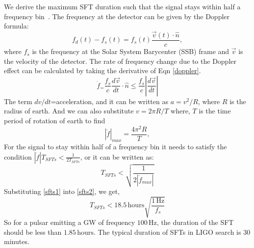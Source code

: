 \documentclass{ttuthes2007}
\begin{document}
We derive the maximum \ac{SFT} duration such that the signal stays within half
a frequency bin~\cite{Krishnan_2004}. The frequency at the detector can be given by the Doppler formula:
\begin{equation}
\label{doppler}
f_d(t) - f_s(t) = f_s(t)\frac{\vec{v}(t)\cdot\hat{n}}{c},
\end{equation}
where $f_s$ is the frequency at the Solar System Barycenter (SSB) frame and
$\vec{v}$ is the velocity of the detector.
The rate of frequency change due to the Doppler effect can be calculated by
taking the derivative of Eqn \ref{doppler}.
\begin{equation}
\dot{f}_= \frac{f_s}{c}\frac{d\vec{v}}{dt}\cdot\hat{n} \leq
\frac{f_s}{c}\left|\frac{d\vec{v}}{dt}\right|
\end{equation}
The term $dv/dt$=acceleration, and it can be written as $a=v^2/R$, where $R$ is
the radius of earth. And we can also substitute $v=2\pi R/T$ where, $T$ is the time
period of rotation of earth to find
\begin{equation}\label{sfts1}
|\dot{f}|_{max}= \frac{4\pi^2R}{T},
\end{equation}
For the signal to stay within half of a frequency bin it needs to satisfy
the condition $|\dot{f}|T_{SFTs} < \frac{1}{2T_{SFTs}}$, or it can be written as:
\begin{equation}\label{sfts2}
T_{SFTs}<\sqrt{\frac{1}{2|\dot{f}_{max}|}}
\end{equation}
Substituting \ref{sfts1} into \ref{sfts2}, we get,
\begin{equation}
T_{SFTs} < 18.5\,\mathrm{hours} \sqrt{\frac{1\,\mathrm{Hz}}{f_s}}
\end{equation}
So for a pulsar emitting a \ac{GW} of frequency $100\,\mathrm{Hz}$, the duration of the
\ac{SFT} should be less than $1.85\,\mathrm{hours}$. The typical duration of \acp{SFT} in
\ac{LIGO} search is 30 minutes.
\end{document}
